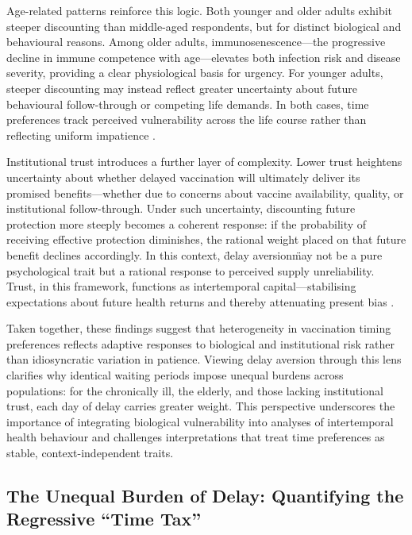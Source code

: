 \documentclass[preprint,12pt]{elsarticle}
\providecommand{\parencite}{\citep}
\begin{document}
Age-related patterns reinforce this logic. Both younger and older adults exhibit steeper discounting than middle-aged respondents, but for distinct biological and behavioural reasons. Among older adults, immunosenescence---the progressive decline in immune competence with age---elevates both infection risk and disease severity, providing a clear physiological basis for urgency. For younger adults, steeper discounting may instead reflect greater uncertainty about future behavioural follow-through or competing life demands. In both cases, time preferences track perceived vulnerability across the life course rather than reflecting uniform impatience \parencite{Lawless2013, Wang2018}.

Institutional trust introduces a further layer of complexity. Lower trust heightens uncertainty about whether delayed vaccination will ultimately deliver its promised benefits---whether due to concerns about vaccine availability, quality, or institutional follow-through. Under such uncertainty, discounting future protection more steeply becomes a coherent response: if the probability of receiving effective protection diminishes, the rational weight placed on that future benefit declines accordingly. In this context, \"delay aversion\" may not be a pure psychological trait but a rational response to perceived supply unreliability. Trust, in this framework, functions as intertemporal capital---stabilising expectations about future health returns and thereby attenuating present bias \parencite{Brewer2017, Betsch2018}.

Taken together, these findings suggest that heterogeneity in vaccination timing preferences reflects adaptive responses to biological and institutional risk rather than idiosyncratic variation in patience. Viewing delay aversion through this lens clarifies why identical waiting periods impose unequal burdens across populations: for the chronically ill, the elderly, and those lacking institutional trust, each day of delay carries greater weight. This perspective underscores the importance of integrating biological vulnerability into analyses of intertemporal health behaviour and challenges interpretations that treat time preferences as stable, context-independent traits.

\subsection{The Unequal Burden of Delay: Quantifying the Regressive ``Time Tax''}
\end{document}
